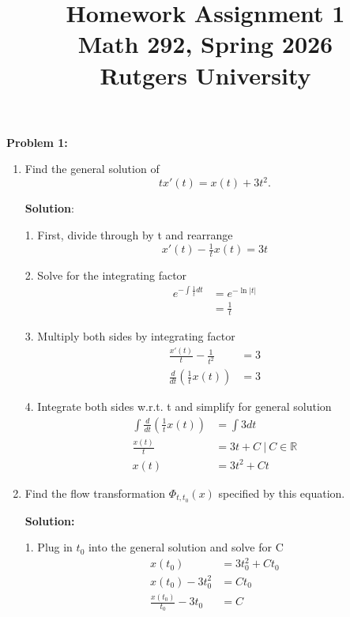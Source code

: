 \documentclass[12pt]{article}
\title{Homework Assignment 1 \\ \large Math 292, Spring 2026 \\ Rutgers University}
\author{}
\date{}
\begin{document}
\maketitle

\noindent \textbf{Problem 1:}
\begin{enumerate}
    \item[(a)] Find the general solution of
          \[ tx'(t) = x(t) + 3t^2. \]

          \textbf{Solution}:

          1. First, divide through by t and rearrange
          \[
              x'(t)-\tfrac{1}{t}x(t)=3t
          \]

          2. Solve for the integrating factor
          \begin{align*}
              e^{-\int{\tfrac{1}{t}dt}} & = e^{-\ln{|t|}} \\
                                        & = \frac{1}{t}
          \end{align*}

          3. Multiply both sides by integrating factor
          \begin{align*}
              \frac{x'(t)}{t} - \frac{1}{t^2} & = 3 \\
              \frac{d}{dt}(\frac{1}{t}x(t))   & = 3
          \end{align*}


          4. Integrate both sides w.r.t. t and simplify for general solution
          \begin{align*}
              \int{}\frac{d}{dt}(\frac{1}{t}x(t)) & = \int{3 dt}                   \\
              \frac{x(t)}{t}                      & = 3t + C ~|~ C \in{\mathbb{R}} \\
              x(t)                                & = 3t^2 + Ct
          \end{align*}



    \item[(b)] Find the flow transformation $\Phi_{t,t_0}(x)$ specified by this equation.

          \textbf{Solution:}

          1. Plug in $t_0$ into the general solution and solve for C
          \begin{align*}
              x(t_0)                    & = 3t_0^2+Ct_0 \\
              x(t_0) - 3t_0^2           & = Ct_0        \\
              \frac{x(t_0)}{t_0} - 3t_0 & = C
          \end{align*}


\end{enumerate}
\end{document}
